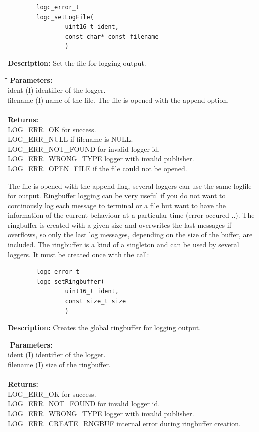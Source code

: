 \documentclass[a4paper, titlepage, 11pt]{article}
\begin{document}
\small
\begin{verbatim}
        logc_error_t
        logc_setLogFile(
                uint16_t ident,
                const char* const filename
                )
\end{verbatim}
\normalsize
\textbf{Description:} Set the file for logging output.
\begin{tabbing}
\hspace*{1cm}\=\hspace*{2cm}\=\hspace*{0,6cm}\= \kill
\textbf{Parameters:} \\
\> ident \> (I) identifier of the logger. \\
\> filename \> (I) name of the file. The file is opened with the append option. \\ \\
\textbf{Returns:} \\
\> LOG\_ERR\_OK for success. \\
\> LOG\_ERR\_NULL if filename is NULL. \\
\> LOG\_ERR\_NOT\_FOUND for invalid logger id. \\
\> LOG\_ERR\_WRONG\_TYPE logger with invalid publisher. \\
\> LOG\_ERR\_OPEN\_FILE if the file could not be opened. \\
\end{tabbing}
The file is opened with the append flag, several loggers can use the same
logfile for output.
\newpage
Ringbuffer logging can be very useful if you do not want to continously log each
message to terminal or a file but want to have the information of the current
behaviour at a particular time (error occured ..). The ringbuffer is created
with a given size and overwrites the last messages if overflows, so only the
last log messages, depending on the size of the buffer, are included. The
ringbuffer is a kind of a singleton and can be used by several loggers. It must
be created once with the call:
\small
\begin{verbatim}
        logc_error_t
        logc_setRingbuffer(
                uint16_t ident,
                const size_t size
                )
\end{verbatim}
\normalsize
\textbf{Description:} Creates the global ringbuffer for logging output.
\begin{tabbing}
\hspace*{1cm}\=\hspace*{2cm}\=\hspace*{0,6cm}\= \kill
\textbf{Parameters:} \\
\> ident \> (I) identifier of the logger. \\
\> filename \> (I) size of the ringbuffer. \\ \\
\textbf{Returns:} \\
\> LOG\_ERR\_OK for success. \\
\> LOG\_ERR\_NOT\_FOUND for invalid logger id. \\
\> LOG\_ERR\_WRONG\_TYPE logger with invalid publisher. \\
\> LOG\_ERR\_CREATE\_RNGBUF internal error during ringbuffer creation. \\
\end{tabbing}
\end{document}

